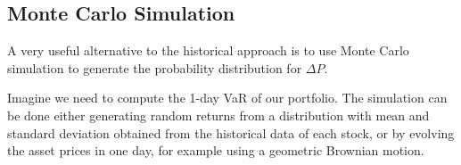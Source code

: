 %
%
%
%
%
%

\subsection{Monte Carlo Simulation}
\label{monte-carlo-simulation}

A very useful alternative to the historical approach is to use Monte Carlo simulation to generate the probability distribution for $\Delta P$. 

Imagine we need to compute the 1-day VaR of our portfolio. The simulation can be done either generating random returns from a distribution with mean and standard deviation obtained from the historical data of each stock, or by evolving the asset prices in one day, for example using a geometric Brownian motion.

